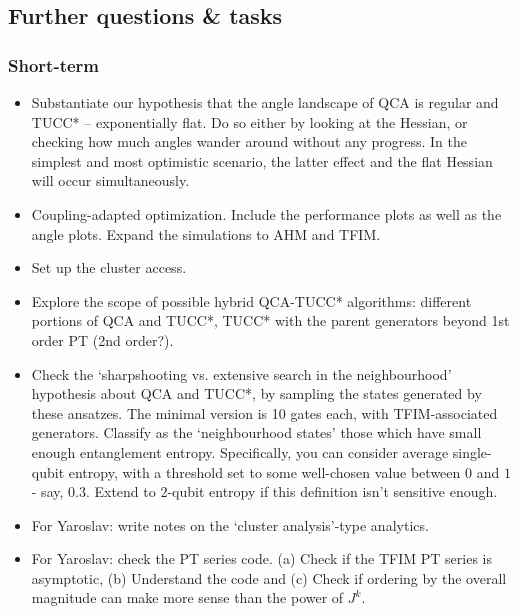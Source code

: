 \documentclass[10pt, a4paper]{article}
\begin{document}
\subsection*{Further questions \& tasks}

\subsubsection*{Short-term}
\begin{itemize}

\item Substantiate our hypothesis that the angle landscape of QCA is regular and TUCC* -- exponentially flat. Do so either by looking at the Hessian, or checking how much angles wander around without any progress. In the simplest and most optimistic scenario, the latter effect and the flat Hessian will occur simultaneously.

\item Coupling-adapted optimization. Include the performance plots as well as the angle plots. Expand the simulations to AHM and TFIM.

\item Set up the cluster access.

\item Explore the scope of possible hybrid QCA-TUCC* algorithms: different portions of QCA and TUCC*, TUCC* with the parent generators beyond 1st order PT (2nd order?). 

\item Check the `sharpshooting vs. extensive search in the neighbourhood' hypothesis about QCA and TUCC*, by sampling the states generated by these ansatzes. The minimal version is 10 gates each, with TFIM-associated generators. Classify as the `neighbourhood states' those which have small enough entanglement entropy. Specifically, you can consider average single-qubit entropy, with a threshold set to some well-chosen value between $0$ and $1$ - say, $0.3$. Extend to $2$-qubit entropy if this definition isn't sensitive enough.

\item For Yaroslav: write notes on the `cluster analysis'-type analytics.

\item For Yaroslav: check the PT series code. (a) Check if the TFIM PT series is asymptotic, (b) Understand the code and (c) Check if ordering by the overall magnitude can make more sense than the power of $J^k$.

\end{itemize}
\end{document}
